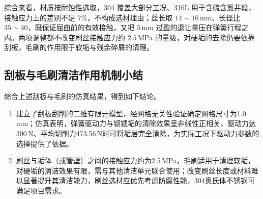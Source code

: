 综合来看，材质按耐蚀性选取，304 覆盖大部分工况、316L 用于含硫含氯井段，接触应力上的差别不足 7\%，不构成选材理由；丝长取 $14\sim16\,\mathrm{mm}$、长径比 $35\sim40$，既保证屈曲前的有效接触，又把 $5\,\mathrm{mm}$ 过盈的退让量压在弹簧行程之内。两项调整都不改变刷丝接触应力约 $2.5\,\mathrm{MPa}$ 的量级，对硬垢的去除仍要依靠刮板，毛刷的作用限于软垢与残余碎屑的清理。

\subsection{刮板与毛刷清洁作用机制小结}
\label{subsec:cleaning_mechanism_summary}

综合上述刮板与毛刷的仿真结果，得到如下结论。

\begin{enumerate}[label=（\arabic*）,leftmargin=2.6em,itemsep=2pt]
\item 建立了刮板刮削的二维有限元模型，经网格无关性验证确定网格尺寸为1.0\,mm；仿真表明，弹簧驱动力与钡锶垢的清除效果呈非线性正相关，驱动力达300\,N、平均切削力473.56\,N时可将垢层完全清除，为实际工况下驱动力参数的选择提供了依据。

\item 刷丝与垢体（或管壁）之间的接触应力约为2.5\,MPa，毛刷适用于清理软垢，对硬垢的清洁效果有限，需与其他清洁单元联合使用；改变刷丝长度或材料难以显著提升其清洁能力，刷丝选材应优先考虑防腐性能，304奥氏体不锈钢可满足项目需求。
\end{enumerate}
